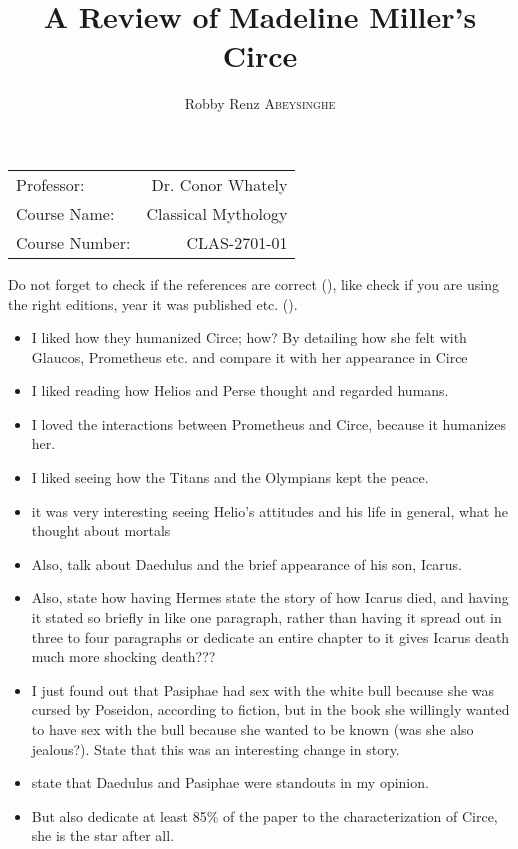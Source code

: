 \documentclass[12pt, a4paper]{article}
\author{Robby Renz \textsc{Abeysinghe}}
\title{A Review of Madeline Miller's Circe}
\begin{document}
\maketitle
\begin{center}
\begin{tabular}{l r}
Professor: & Dr. Conor Whately \\
Course Name: & Classical Mythology \\
Course Number: & CLAS-2701-01
\end{tabular}
\end{center}
\newpage

Do not forget to check if the references are correct (\cite{homer_odyssey_1998}), like check if you are using the right editions, year it was published etc. (\cite{miller_circe_2018}).

\begin{itemize}
	\item I liked how they humanized Circe; how? By detailing how she felt with Glaucos, Prometheus etc. and compare it with her appearance in Circe
	\item I liked reading how Helios and Perse thought and regarded humans.
	\item I loved the interactions between Prometheus and Circe, because it humanizes her.
	\item I liked seeing how the Titans and the Olympians kept the peace.
	\item it was very interesting seeing Helio's attitudes and his life in general, what he thought about mortals
	\item Also, talk about Daedulus and the brief appearance of his son, Icarus.
	\item Also, state how having Hermes state the story of how Icarus died, and having it stated so briefly in like one paragraph, rather than having it spread out in three to four paragraphs or dedicate an entire chapter to it gives Icarus death much more shocking death???
	\item I just found out that Pasiphae had sex with the white bull because she was cursed by Poseidon, according to fiction, but in the book she willingly wanted to have sex with the bull because she wanted to be known (was she also jealous?). State that this was an interesting change in story.
	\item state that Daedulus and Pasiphae were standouts in my opinion.
	\item But also dedicate at least 85\% of the paper to the characterization of Circe, she is the star after all.
\end{itemize}
\end{document}
